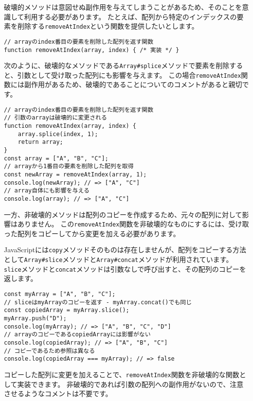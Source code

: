 破壊的メソッドは意図せぬ副作用を与えてしまうことがあるため、そのことを意識して利用する必要があります。
たとえば、配列から特定のインデックスの要素を削除する\texttt{removeAtIndex}という関数を提供したいとします。

\begin{lstlisting}
// arrayのindex番目の要素を削除した配列を返す関数
function removeAtIndex(array, index) { /* 実装 */ }
\end{lstlisting}

次のように、破壊的なメソッドである\texttt{Array\#splice}メソッドで要素を削除すると、引数として受け取った配列にも影響を与えます。
この場合\texttt{removeAtIndex}関数には副作用があるため、破壊的であることについてのコメントがあると親切です。

\begin{lstlisting}
// arrayのindex番目の要素を削除した配列を返す関数
// 引数のarrayは破壊的に変更される
function removeAtIndex(array, index) {
    array.splice(index, 1);
    return array;
}
const array = ["A", "B", "C"];
// arrayから1番目の要素を削除した配列を取得
const newArray = removeAtIndex(array, 1);
console.log(newArray); // => ["A", "C"]
// array自体にも影響を与える
console.log(array); // => ["A", "C"]
\end{lstlisting}

一方、非破壊的メソッドは配列のコピーを作成するため、元々の配列に対して影響はありません。
この\texttt{removeAtIndex}関数を非破壊的なものにするには、受け取った配列をコピーしてから変更を加える必要があります。

JavaScriptには\texttt{copy}メソッドそのものは存在しませんが、配列をコピーする方法として\texttt{Array\#slice}メソッドと\texttt{Array\#concat}メソッドが利用されています。\texttt{slice}メソッドと\texttt{concat}メソッドは引数なしで呼び出すと、その配列のコピーを返します。

\begin{lstlisting}
const myArray = ["A", "B", "C"];
// sliceはmyArrayのコピーを返す - myArray.concat()でも同じ
const copiedArray = myArray.slice(); 
myArray.push("D");
console.log(myArray); // => ["A", "B", "C", "D"]
// arrayのコピーであるcopiedArrayには影響がない
console.log(copiedArray); // => ["A", "B", "C"]
// コピーであるため参照は異なる
console.log(copiedArray === myArray); // => false
\end{lstlisting}

コピーした配列に変更を加えることで、\texttt{removeAtIndex}関数を非破壊的な関数として実装できます。
非破壊的であれば引数の配列への副作用がないので、注意させるようなコメントは不要です。


